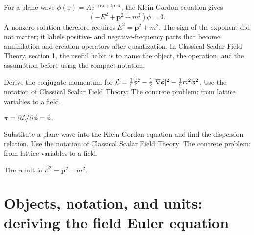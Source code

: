 \begin{example}
For a plane wave \(\phi(x)=Ae^{-\ii Et+\ii\bm p\cdot\bm x}\), the Klein-Gordon equation gives
\[
  (-E^2+\bm p^2+m^2)\phi=0.
\]
A nonzero solution therefore requires \(E^2=\bm p^2+m^2\).  The sign of the exponent did not matter; it labels positive- and negative-frequency parts that become annihilation and creation operators after quantization.  In Classical Scalar Field Theory, section 1, the useful habit is to name the object, the operation, and the assumption before using the compact notation.
\end{example}



\begin{exercise}
Derive the conjugate momentum for \(\mathcal L=\frac12\dot\phi^2-\frac12|\nabla\phi|^2-\frac12m^2\phi^2\).  Use the notation of Classical Scalar Field Theory: The concrete problem: from lattice variables to a field.
\begin{answer}
\(\pi=\partial\mathcal L/\partial\dot\phi=\dot\phi\).
\end{answer}
\end{exercise}

\begin{exercise}
Substitute a plane wave into the Klein-Gordon equation and find the dispersion relation.  Use the notation of Classical Scalar Field Theory: The concrete problem: from lattice variables to a field.
\begin{answer}
The result is \(E^2=\bm p^2+m^2\).
\end{answer}
\end{exercise}



\section{Objects, notation, and units: deriving the field Euler equation}













